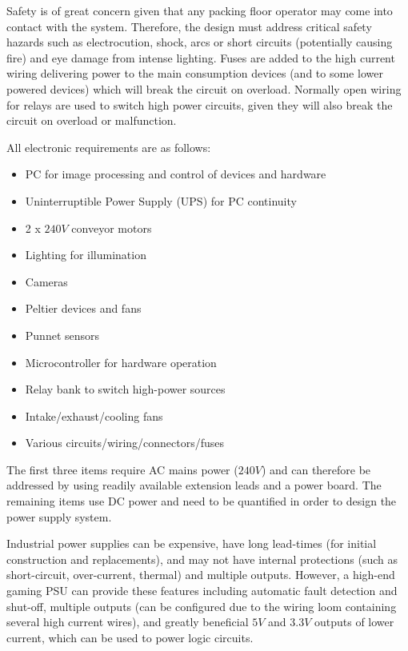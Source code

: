 \documentclass[fleqn,twoside,12pt]{report}
\begin{document}
Safety is of great concern given that any packing floor operator may come into contact with the system. Therefore, the design must address critical safety hazards such as electrocution, shock, arcs or short circuits (potentially causing fire) and eye damage from intense lighting. Fuses are added to the high current wiring delivering power to the main consumption devices (and to some lower powered devices) which will break the circuit on overload. Normally open wiring for relays are used to switch high power circuits, given they will also break the circuit on overload or malfunction.  


All electronic requirements are as follows:



\begin{itemize}
	\item PC for image processing and control of devices and hardware
	\item Uninterruptible Power Supply (UPS) for PC continuity
	\item 2 x $240V$ conveyor motors
	\item Lighting for illumination
	\item Cameras
	\item Peltier devices and fans 
	\item Punnet sensors
	\item Microcontroller for hardware operation
	\item Relay bank to switch high-power sources
	\item Intake/exhaust/cooling fans
	\item Various circuits/wiring/connectors/fuses
\end{itemize} 

The first three items require AC mains power ($240V$) and can therefore be addressed by using readily available extension leads and a power board. The remaining items use DC power and need to be quantified in order to design the power supply system.

Industrial power supplies can be expensive, have long lead-times (for initial construction and replacements), and may not have internal protections (such as short-circuit, over-current, thermal) and multiple outputs. However, a high-end gaming PSU can provide these features including automatic fault detection and shut-off, multiple outputs (can be configured due to the wiring loom containing several high current wires), and greatly beneficial $5V$ and $3.3V$ outputs of lower current, which can be used to power logic circuits. 
\end{document}

